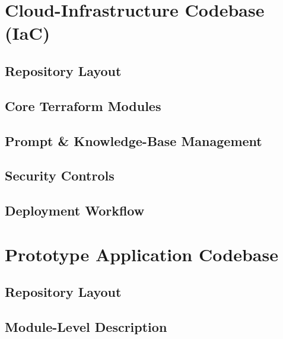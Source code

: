 \section{Cloud-Infrastructure Codebase (IaC)}

\subsection{Repository Layout}

\subsection{Core Terraform Modules}

\subsection{Prompt & Knowledge-Base Management}

\subsection{Security Controls}

\subsection{Deployment Workflow}

\section{Prototype Application Codebase}

\subsection{Repository Layout}

\subsection{Module-Level Description}

